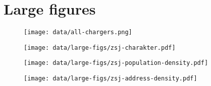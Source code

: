\chapter{Large figures}



\begin{figure}
    \texttt{[image: data/all-chargers.png]}
    \caption{}{}
    \label{fig-large:all-chargers}
\end{figure}

\begin{figure}
    \texttt{[image: data/large-figs/zsj-charakter.pdf]}
    \caption{}{}
    \label{fig-large:zsj-character}
\end{figure}

\begin{figure}
    \texttt{[image: data/large-figs/zsj-population-density.pdf]}
    \caption{}{}
    \label{fig-large:zsj-population-density}
\end{figure}

\begin{figure}
    \texttt{[image: data/large-figs/zsj-address-density.pdf]}
    \caption{}{}
    \label{fig-large:zsj-address-density}
\end{figure}
